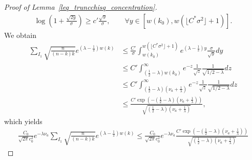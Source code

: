 \documentclass[10pt,a4paper]{amsart}
\begin{document}
\begin{proof}[Proof of Lemma~\ref{leq_truncchisq_concentration}]
\begin{align*}
    \log\left(1+ \frac{\sqrt{2y}}{\sigma}\right) \geq c'\frac{\sqrt{y}}{\sigma}, \qquad \forall y \in \left[{w(k_0)},{w(\lfloor C^*\sigma^2\rfloor + 1)} \right].
\end{align*}
We obtain
\begin{align*}
    \sum_{I_1} \sqrt{\frac{n}{(n-k)k}} e^{\left(\lambda - \frac{1}{2}\right)w(k)}
    & \leq \frac{C'}{\sigma} \int_{w(k_0)}^{w(\lfloor C^*\sigma^2\rfloor + 1)} e^{(\lambda - \frac{1}{2}) y} \frac{\sigma}{\sqrt{y}} dy\\[5pt]
    & \leq C' \int_{(\frac{1}{2} - \lambda)w(k_0)}^\infty e^{-z} \frac{1}{\sqrt{z}} \frac{1}{\sqrt{1/2 - \lambda}} dz\\[5pt]
    & \leq C' \int_{(\frac{1}{2} - \lambda)(\nu_a + \frac{1}{\lambda})}^\infty e^{-z} \frac{1}{\sqrt{z}} \frac{1}{\sqrt{1/2 - \lambda}} dz\\[5pt]
    & \leq \frac{C' \exp\left(- (\frac{1}{2} - \lambda)(\nu_a + \frac{1}{\lambda})\right)}{\sqrt{(\frac{1}{2} - \lambda)(\nu_a + \frac{1}{\lambda})}},
\end{align*}
which yields
\begin{align}
    \frac{C_0}{\sqrt{2\pi}c_0^2} e^{-\lambda \nu_a} \sum_{I_1} \sqrt{\frac{n}{(n-k)k}} e^{\left(\lambda - \frac{1}{2}\right)w(k)} \leq \frac{C_0}{\sqrt{2\pi}c_0^2} e^{-\lambda \nu_a} \frac{C' \exp\left(- (\frac{1}{2} - \lambda)(\nu_a + \frac{1}{\lambda})\right)}{\sqrt{(\frac{1}{2} - \lambda)(\nu_a + \frac{1}{\lambda})}}\label{eq_thirn_term_I1}
\end{align}



\end{proof}
\end{document}
